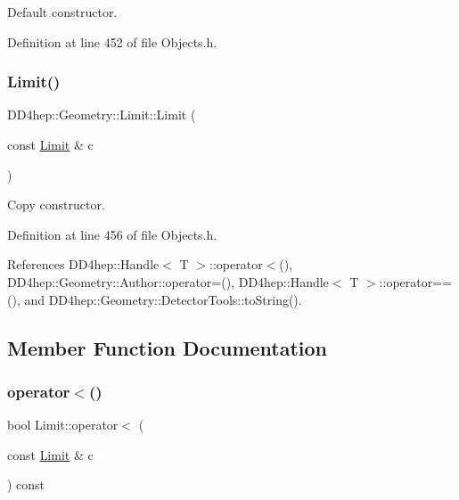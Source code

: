 Default constructor. 



Definition at line 452 of file Objects.\+h.

\hypertarget{class_d_d4hep_1_1_geometry_1_1_limit_a60ce84b00fb40254e489228e52db8aab}{}\label{class_d_d4hep_1_1_geometry_1_1_limit_a60ce84b00fb40254e489228e52db8aab} 
\subsubsection{\texorpdfstring{Limit()}{Limit()}\hspace{0.1cm}{\footnotesize\ttfamily [2/2]}}
{\footnotesize\ttfamily D\+D4hep\+::\+Geometry\+::\+Limit\+::\+Limit (\begin{DoxyParamCaption}\item[{const \hyperlink{class_d_d4hep_1_1_geometry_1_1_limit}{Limit} \&}]{c }\end{DoxyParamCaption})\hspace{0.3cm}{\ttfamily [inline]}}



Copy constructor. 



Definition at line 456 of file Objects.\+h.



References D\+D4hep\+::\+Handle$<$ T $>$\+::operator$<$(), D\+D4hep\+::\+Geometry\+::\+Author\+::operator=(), D\+D4hep\+::\+Handle$<$ T $>$\+::operator==(), and D\+D4hep\+::\+Geometry\+::\+Detector\+Tools\+::to\+String().



\subsection{Member Function Documentation}
\hypertarget{class_d_d4hep_1_1_geometry_1_1_limit_ac66f41fcb6396cd76ab035804daddfa7}{}\label{class_d_d4hep_1_1_geometry_1_1_limit_ac66f41fcb6396cd76ab035804daddfa7} 
\subsubsection{\texorpdfstring{operator$<$()}{operator<()}}
{\footnotesize\ttfamily bool Limit\+::operator$<$ (\begin{DoxyParamCaption}\item[{const \hyperlink{class_d_d4hep_1_1_geometry_1_1_limit}{Limit} \&}]{c }\end{DoxyParamCaption}) const}



